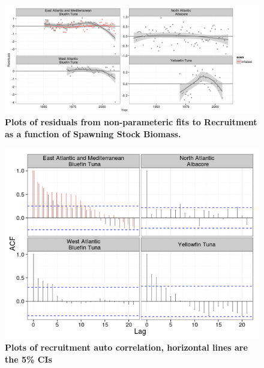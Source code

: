 \documentclass[a4paper, 10pt]{article}
\begin{document}
\begin{figure}[!ht]\begin{center} 
\includegraphics{figs/sr-np-rsd.png}
\end{center}
\caption{\bf{Plots of residuals from non-parameteric fits to Recruitment as a function of Spawning Stock Biomass.}}
\label{rsd}\end{figure} 

\begin{figure}[!ht]\begin{center} 
\includegraphics{figs/sr-acf-rec.png}
\end{center}
\caption{\bf{Plots of recruitment auto correlation, horizontal lines are the 5\% CIs}}
\label{acf}\end{figure} 
\end{document}
